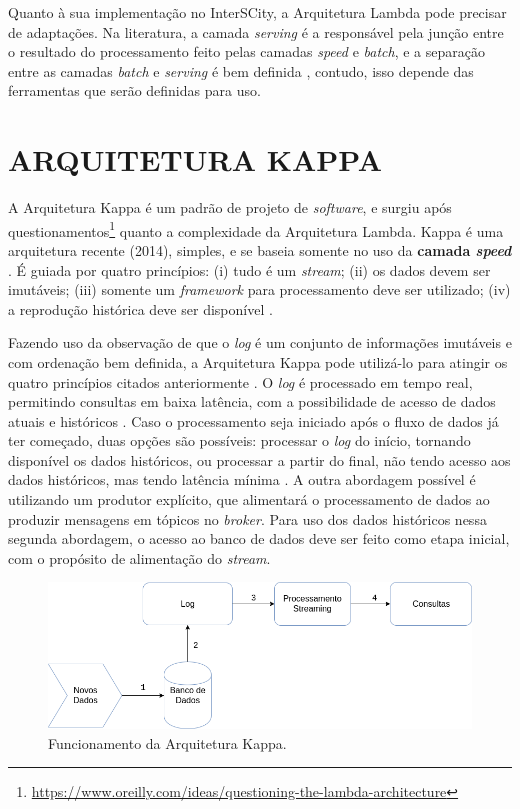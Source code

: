 Quanto à sua implementação no InterSCity, a Arquitetura Lambda pode precisar de
adaptações. Na literatura, a camada \textit{serving} é a responsável pela
junção entre o resultado do processamento feito pelas camadas \textit{speed} e
\textit{batch}, e a separação entre as camadas \textit{batch} e \textit{serving}
é bem definida \cite{marz2015}, contudo, isso depende das ferramentas que
serão definidas para uso. 

\section{ARQUITETURA KAPPA}

A Arquitetura Kappa é um padrão de projeto de \textit{software}, e surgiu após
questionamentos\footnote{\url{https://www.oreilly.com/ideas/questioning-the-lambda-architecture}}
quanto a complexidade da Arquitetura Lambda. Kappa é uma arquitetura recente (2014),
simples, e se baseia somente no uso da \textbf{camada \textit{speed}}
\cite{seyvet2016}. É guiada por quatro princípios:
(i) tudo é um \textit{stream}; (ii) os dados devem ser imutáveis; (iii)
somente um \textit{framework} para processamento deve ser utilizado; (iv) a
reprodução histórica deve ser disponível \cite{seyvet2016}.

Fazendo uso da observação de que o \textit{log} é um conjunto de informações
imutáveis e com ordenação bem definida, a Arquitetura Kappa pode utilizá-lo
para atingir os quatro princípios citados anteriormente \cite{kreps2014}. O
\textit{log} é processado em tempo real, permitindo consultas em baixa
latência, com a possibilidade de acesso de dados atuais e históricos
\cite{forgeat2015}. Caso o processamento seja iniciado após o fluxo de dados já
ter começado, duas opções são possíveis: processar o \textit{log} do início,
tornando disponível os dados históricos, ou processar a partir do final,
não tendo acesso aos dados históricos, mas tendo latência mínima
\cite{kreps2014}. A outra abordagem possível é utilizando um produtor
explícito, que alimentará o processamento de dados ao produzir mensagens em
tópicos no \textit{broker}. Para uso dos dados históricos nessa segunda
abordagem, o acesso ao banco de dados deve ser feito como etapa inicial, com
o propósito de alimentação do \textit{stream}.

\begin{figure}
  \centering
    \includegraphics[scale=0.5]{figuras/kappa_architecture.png}
  \caption{Funcionamento da Arquitetura Kappa.}
  \label{fig:kappa-lifecycle}
\end{figure}

